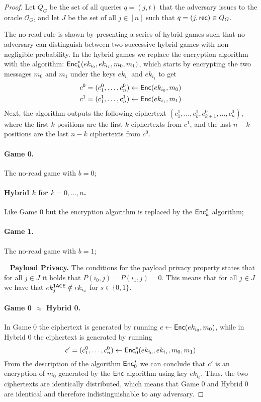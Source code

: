\documentclass{llncs}
\begin{document}
\begin{proof}
Let $Q_G$ be the set of all queries $q = (j,t)$ that the adversary issues to the oracle $\mathcal{O}_G$, and let $J$ be the set of all $j\in[n]$ such that $q = (j,\mathsf{rec}) \in Q_G$. 

The no-read rule is shown by presenting a series of hybrid games such that no adversary can distinguish between two successive hybrid games with non-negligible probability.
In the hybrid games we  replace the encryption algorithm with the algorithm: $\mathsf{Enc}_k^*(ek_{i_0},ek_{i_1},m_0,m_1)$, which starts by encrypting the two messages $m_0$ and $m_1$ under the keys $ek_{i_0}$ and $ek_{i_1}$ to get 
\begin{align*}
c^0 &= (c_1^0,\dots,c_n^0) \gets \mathsf{Enc}(ek_{i_0},m_0) \\
c^1 &= (c_1^1,\dots,c_n^1) \gets \mathsf{Enc}(ek_{i_1},m_1)
\end{align*}
Next, the algorithm outputs the following ciphertext $(c_1^1,\dots,c_k^1,c_{k+1}^0,\dots,c_n^0)$, where the first $k$ positions are the first $k$ \oACE ciphertexts from $c^1$, and the last $n-k$ positions are the last $n-k$ \oACE ciphertexts from $c^0$.

\paragraph{Game 0.} The no-read game with $b=0$;
\paragraph{Hybrid $k$ for $k=0,\dots,n$.} Like Game 0 but the encryption algorithm is replaced by the $\mathsf{Enc}_k^*$ algorithm;
\paragraph{Game 1.} The no-read game with $b=1$;


\ \newline
\noindent\textbf{Payload Privacy.} 
The conditions for the payload privacy property states that for all $j \in J$ it holds that $P(i_0,j) = P(i_1,j) = 0$.
This means that for all $j \in J$ we have that $ek_j^{\mathsf{1ACE}} \notin ek_{i_s}$ for $s \in \{0,1 \}$.

\paragraph{Game 0 $\approx$ Hybrid 0.} 
In  Game 0 the ciphertext is generated by running $c \gets \mathsf{Enc}(ek_{i_0},m_0)$, while in Hybrid 0 the ciphertext is generated by running $$c' = (c_1^0,\dots,c_n^0) \gets \mathsf{Enc}_0^*(ek_{i_0},ek_{i_1},m_0,m_1)$$
From the description of the algorithm $\mathsf{Enc}_0^*$ we can conclude that $c'$ is an encryption of $m_0$ generated by the $\mathsf{Enc}$ algorithm using key $ek_{i_0}$.
Thus, the two ciphertexts are identically distributed, which means that Game 0 and Hybrid 0 are identical and therefore indistinguishable to any adversary.


\end{proof}
\end{document}
